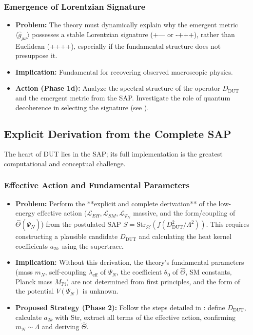 \documentclass[11pt, a4paper]{article}
\theoremstyle{remark}
\newcommand{\Op}[1]{\hat{#1}}
\newcommand{\Str}{\mathrm{Str}}
\begin{document}
\subsubsection{Emergence of Lorentzian Signature}
\label{ssubsec:lorentz_sig_challenge_detailed}
\begin{itemize}
    \item \textbf{Problem:} The theory must dynamically explain why the emergent metric \( \langle \Op{g}_{\mu\nu} \rangle \) possesses a stable Lorentzian signature (+--- or -+++), rather than Euclidean (++++), especially if the fundamental structure does not presuppose it.
    \item \textbf{Implication:} Fundamental for recovering observed macroscopic physics.
    \item \textbf{Action (Phase 1d):} Analyze the spectral structure of the operator \( D_{\text{DUT}} \) and the emergent metric from the SAP. Investigate the role of quantum decoherence in selecting the signature (see ).
\end{itemize}

\subsection{Explicit Derivation from the Complete SAP }
\label{subsec:pae_derivation_detailed}

The heart of DUT lies in the SAP; its full implementation is the greatest computational and conceptual challenge.

\subsubsection{Effective Action and Fundamental Parameters }
\label{ssubsec:pae_derivation_challenge_detailed}
\begin{itemize}
    \item \textbf{Problem:} Perform the **explicit and complete derivation** of the low-energy effective action (\(\mathcal{L}_{EH}, \mathcal{L}_{SM}, \mathcal{L}_{\Psi_N}\) massive, and the form/coupling of \( \Op{\Theta}(\Op{\Psi}_N) \)) from the postulated SAP \( S = \Str_{\mathcal{H}}(f(D_{\text{DUT}}^2/\Lambda^2)) \). This requires constructing a plausible candidate \( D_{\text{DUT}} \) and calculating the heat kernel coefficients \( a_{2k} \) using the supertrace.
    \item \textbf{Implication:} Without this derivation, the theory's fundamental parameters (mass \( m_N \), self-coupling \( \lambda_{\text{eff}} \) of \( \Psi_N \), the coefficient \( \theta_0 \) of \( \Op{\Theta} \), SM constants, Planck mass \( M_{\text{Pl}} \)) are not determined from first principles, and the form of the potential \(V(\Psi_N)\) is unknown.
    \item \textbf{Proposed Strategy (Phase 2):} Follow the steps detailed in : define \( D_{\text{DUT}} \), calculate \(a_{2k}\) with Str, extract all terms of the effective action, confirming \( m_N \sim \Lambda \) and deriving \( \Op{\Theta} \).
\end{itemize}
\end{document}
